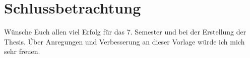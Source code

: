 \section{Schlussbetrachtung}
Wünsche Euch allen viel Erfolg für das 7. Semester und bei der Erstellung der Thesis. Über Anregungen und Verbesserung an dieser Vorlage würde ich mich sehr freuen. 